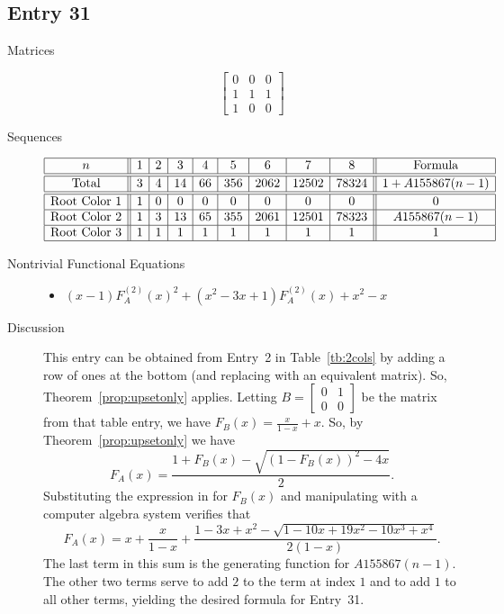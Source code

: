 \documentclass[12pt]{amsart}
\newcommand{\gfll}[1]{F_{#1}(x)}
\newcommand{\gfall}{\gfll{A}}
\newcommand{\gff}[2]{F_{#2}^{(#1)}(x)}
\newcommand{\gfa}[1]{\gff{#1}{A}}
\begin{document}
\subsection*{Entry 31}
\begin{description}
    \item[Matrices]
    
    \[\begin{bmatrix}
0 & 0 & 0 \\
1 & 1 & 1 \\
1 & 0 & 0
\end{bmatrix}\]
    \item[Sequences]\hspace*{\fill}\vspace{-0.5cm}
    \begin{center}
        \[
        \begin{array}{|c||c|c|c|c|c|c|c|c||c|}\hline
           n  & 1 & 2 & 3 & 4 & 5 & 6 & 7 & 8  & \text{Formula}\\\hline\hline
           \text{Total}  & 3 & 4 & 14 & 66 & 356 & 2062 & 12502 & 78324 & 1+A155867(n-1)\\\hline\hline
           \text{Root Color }1 & 1 & 0 & 0 & 0 & 0 & 0 & 0 & 0 & 0\\\hline
           \text{Root Color }2 & 1 & 3 & 13 & 65 & 355 & 2061 & 12501 & 78323 & A155867(n-1)\\\hline
           \text{Root Color }3 & 1 & 1 & 1 & 1 & 1 & 1 & 1 & 1 & 1\\\hline
        \end{array}
        \]
    \end{center}
    
    \item[Nontrivial Functional Equations]\hspace*{\fill}

    \begin{itemize}
\item $(x - 1)\gfa{2}^2+(x^2 - 3x + 1)\gfa{2}+x^2 - x$


\end{itemize}
    \item[Discussion] This entry can be obtained from Entry~2 in Table~\ref{tb:2cols} by adding a row of ones at the bottom (and replacing with an equivalent matrix). So, Theorem~\ref{prop:upsetonly} applies. Letting $B=\begin{bmatrix}
        0&1\\0&0
    \end{bmatrix}$ be the matrix from that table entry, 
    we have $\gfll{B}=\frac{x}{1-x} + x$. So, by Theorem~\ref{prop:upsetonly} we have
\[
\gfall=\frac{1+\gfll{B}-\sqrt{(1-\gfll{B})^2-4x}}{2}.
\]
Substituting the expression in for $\gfll{B}$ and manipulating with a computer algebra system verifies that
\[
\gfall=x + \frac{x}{1-x}+ \frac{1 - 3x + x^2 - \sqrt{1 - 10x + 19x^2 - 10 x^3+x^4}}{2(1-x)}.
\]
The last term in this sum is the generating function for $A155867(n-1)$. The other two terms serve to add $2$ to the term at index $1$ and to add $1$ to all other terms, yielding the desired formula for Entry~31.
\end{description}
\end{document}
